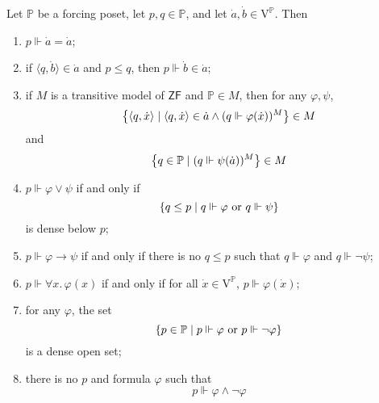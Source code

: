 \begin{proposition}
    Let \( \mathbb P \) be a forcing poset, let \( p, q \in \mathbb P \), and let \( \dot a, \dot b \in \mathrm{V}^{\mathbb P} \).
    Then
    \begin{enumerate}
        \item \( p \Vdash \dot a = \dot a \);
        \item if \( \langle q, \dot b \rangle \in \dot a \) and \( p \leq q \), then \( p \Vdash \dot b \in \dot a \);
        \item if \( M \) is a transitive model of \( \mathsf{ZF} \) and \( \mathbb P \in M \), then for any \( \varphi, \psi \),
        \[ \qty{\langle q, \dot x \rangle \mid \langle q, \dot x \rangle \in \dot a \wedge (q \Vdash \varphi(\dot x))^M} \in M \]
        and
        \[ \qty{q \in \mathbb P \mid (q \Vdash \psi(\dot a))^M} \in M \]
        \item \( p \Vdash \varphi \vee \psi \) if and only if
        \[ \qty{q \leq p \mid q \Vdash \varphi \text{ or } q \Vdash \psi} \]
        is dense below \( p \);
        \item \( p \Vdash \varphi \to \psi \) if and only if there is no \( q \leq p \) such that \( q \Vdash \varphi \) and \( q \Vdash \neg \psi \);
        \item \( p \Vdash \forall x.\, \varphi(x) \) if and only if for all \( \dot x \in \mathrm{V}^{\mathbb P} \), \( p \Vdash \varphi(\dot x) \);
        \item for any \( \varphi \), the set
        \[ \qty{p \in \mathbb P \mid p \Vdash \varphi \text{ or } p \Vdash \neg\varphi} \]
        is a dense open set;
        \item there is no \( p \) and formula \( \varphi \) such that
        \[ p \Vdash \varphi \wedge \neg\varphi \]
    \end{enumerate}
\end{proposition}


